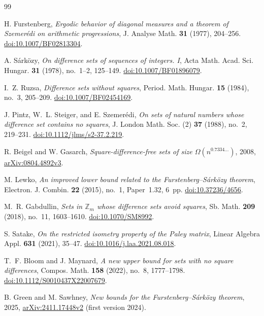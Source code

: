 \documentclass[11pt]{article}
\theoremstyle{definition}
\theoremstyle{remark}
\begin{document}
\begin{thebibliography}{99}

H. Furstenberg,
\emph{Ergodic behavior of diagonal measures and a theorem of
Szemer\'edi on arithmetic progressions},
J. Analyse Math. \textbf{31} (1977), 204--256.
\href{https://doi.org/10.1007/BF02813304}{doi:10.1007/BF02813304}.

A. S\'ark\"ozy,
\emph{On difference sets of sequences of integers. I},
Acta Math. Acad. Sci. Hungar. \textbf{31} (1978), no.~1--2, 125--149.
\href{https://doi.org/10.1007/BF01896079}{doi:10.1007/BF01896079}.

I.~Z. Ruzsa, \emph{Difference sets without squares},
Period. Math. Hungar. \textbf{15} (1984), no.~3, 205--209.
\href{https://doi.org/10.1007/BF02454169}{doi:10.1007/BF02454169}.

J. Pintz, W.~L. Steiger, and E. Szemer\'edi,
\emph{On sets of natural numbers whose difference set contains no squares},
J. London Math. Soc. (2) \textbf{37} (1988), no.~2, 219--231.
\href{https://doi.org/10.1112/jlms/s2-37.2.219}{doi:10.1112/jlms/s2-37.2.219}.

R. Beigel and W. Gasarch,
\emph{Square-difference-free sets of size $\Omega(n^{0.7334\ldots})$},
2008, \href{https://arxiv.org/abs/0804.4892v3}{arXiv:0804.4892v3}.

M. Lewko,
\emph{An improved lower bound related to the
Furstenberg--S\'ark\"ozy theorem},
Electron. J. Combin. \textbf{22} (2015), no.~1, Paper~1.32, 6~pp.
\href{https://doi.org/10.37236/4656}{doi:10.37236/4656}.

M.~R. Gabdullin,
\emph{Sets in $\mathbb Z_m$ whose difference sets avoid squares},
Sb. Math. \textbf{209} (2018), no.~11, 1603--1610.
\href{https://doi.org/10.1070/SM8992}{doi:10.1070/SM8992}.

S. Satake,
\emph{On the restricted isometry property of the Paley matrix},
Linear Algebra Appl. \textbf{631} (2021), 35--47.
\href{https://doi.org/10.1016/j.laa.2021.08.018}{doi:10.1016/j.laa.2021.08.018}.

T.~F. Bloom and J. Maynard,
\emph{A new upper bound for sets with no square differences},
Compos. Math. \textbf{158} (2022), no.~8, 1777--1798.
\href{https://doi.org/10.1112/S0010437X22007679}{doi:10.1112/S0010437X22007679}.

B. Green and M. Sawhney,
\emph{New bounds for the Furstenberg--S\'ark\"ozy theorem},
2025, \href{https://arxiv.org/abs/2411.17448v2}{arXiv:2411.17448v2}
(first version 2024).


\end{thebibliography}
\end{document}
